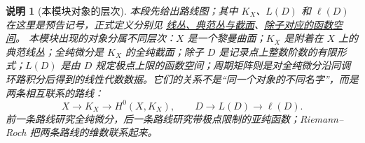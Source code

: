 \documentclass[UTF8,fontset=none,a4paper,11pt]{ctexart}
\theoremstyle{foundation-definition}
\theoremstyle{foundation-theorem}
\theoremstyle{foundation-proposition}
\theoremstyle{foundation-example}
\theoremstyle{foundation-remark}
\newtheorem{remark}[definition]{说明}
\theoremstyle{foundation-theorem}
\newcommand{\term}[2]{\hyperref[#1]{#2}}
\begin{document}
\begin{remark}[本模块对象的层次]
本段先给出路线图；其中 \(K_X\)、\(L(D)\) 和 \(\ell(D)\) 在这里是预告记号，正式定义分别见
\term{def:line-bundle}{线丛、典范丛与截面}、\term{def:divisor-space}{除子对应的函数空间}。
本模块出现的对象分属不同层次：\(X\) 是一个黎曼曲面；\(K_X\) 是附着在 \(X\) 上的典范线丛；全纯微分是 \(K_X\) 的全纯截面；除子 \(D\) 是记录点上整数阶数的有限形式；\(L(D)\) 是由 \(D\) 规定极点上限的函数空间；周期矩阵则是对全纯微分沿同调环路积分后得到的线性代数数据。它们的关系不是“同一个对象的不同名字”，而是两条相互联系的路线：
\[
X\longrightarrow K_X\longrightarrow H^0(X,K_X),
\qquad
D\longrightarrow L(D)\longrightarrow \ell(D).
\]
前一条路线研究全纯微分，后一条路线研究带极点限制的亚纯函数；Riemann--Roch 把两条路线的维数联系起来。
\end{remark}
\end{document}
